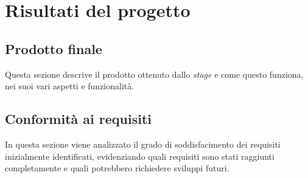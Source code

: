 \section{Risultati del progetto}
\subsection{Prodotto finale}
Questa sezione descrive il prodotto ottenuto dallo \textit{stage} e come questo funziona, nei suoi vari aspetti e funzionalità.
\subsection{Conformità ai requisiti}
In questa sezione viene analizzato il grado di soddisfacimento dei requisiti inizialmente identificati, evidenziando quali requisiti sono stati raggiunti completamente e quali potrebbero richiedere sviluppi futuri.